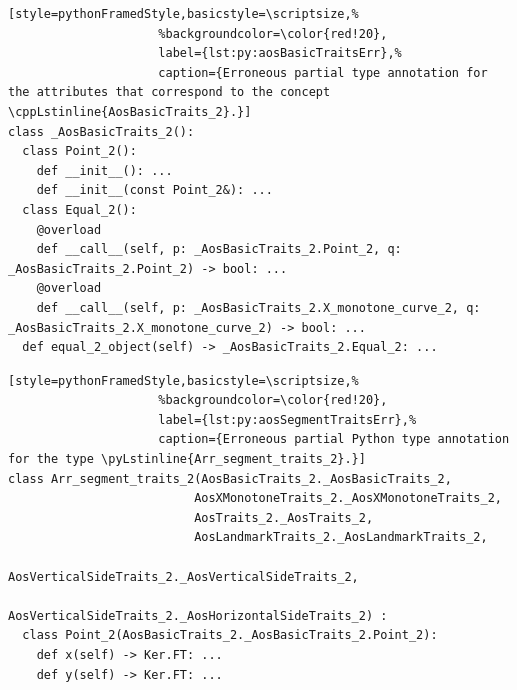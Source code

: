 \begin{lstfloat}
  \begin{draft}
  \begin{lstlisting}[style=pythonFramedStyle,basicstyle=\scriptsize,%
                     %backgroundcolor=\color{red!20},
                     label={lst:py:aosBasicTraitsErr},%
                     caption={Erroneous partial type annotation for the attributes that correspond to the concept \cppLstinline{AosBasicTraits_2}.}]
class _AosBasicTraits_2():
  class Point_2():
    def __init__(): ...
    def __init__(const Point_2&): ...
  class Equal_2():
    @overload
    def __call__(self, p: _AosBasicTraits_2.Point_2, q: _AosBasicTraits_2.Point_2) -> bool: ...
    @overload
    def __call__(self, p: _AosBasicTraits_2.X_monotone_curve_2, q: _AosBasicTraits_2.X_monotone_curve_2) -> bool: ...
  def equal_2_object(self) -> _AosBasicTraits_2.Equal_2: ...
  \end{lstlisting}
  \end{draft}
\end{lstfloat}

\begin{lstfloat}
  \begin{draft}
  \begin{lstlisting}[style=pythonFramedStyle,basicstyle=\scriptsize,%
                     %backgroundcolor=\color{red!20},
                     label={lst:py:aosSegmentTraitsErr},%
                     caption={Erroneous partial Python type annotation for the type \pyLstinline{Arr_segment_traits_2}.}]
class Arr_segment_traits_2(AosBasicTraits_2._AosBasicTraits_2,
                          AosXMonotoneTraits_2._AosXMonotoneTraits_2,
                          AosTraits_2._AosTraits_2,
                          AosLandmarkTraits_2._AosLandmarkTraits_2,
                          AosVerticalSideTraits_2._AosVerticalSideTraits_2,
                          AosVerticalSideTraits_2._AosHorizontalSideTraits_2) :
  class Point_2(AosBasicTraits_2._AosBasicTraits_2.Point_2):
    def x(self) -> Ker.FT: ...
    def y(self) -> Ker.FT: ...
  \end{lstlisting}
  \end{draft}
\end{lstfloat}

